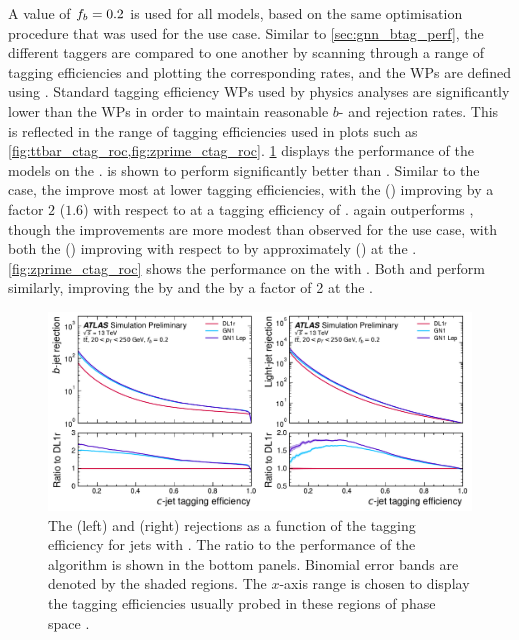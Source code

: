 A value of $f_b = 0.2$ is used for all models, based on the same optimisation procedure that was used for the \btag use case.
Similar to \cref{sec:gnn_btag_perf}, the different taggers are compared to one another by scanning through a range of \cjet tagging efficiencies and plotting the corresponding \blrej rates, and the WPs are defined using \ttbarjets.
Standard \cjet tagging efficiency WPs used by physics analyses are significantly lower than the \btag WPs in order to maintain reasonable $b$- and \ljet rejection rates.
This is reflected in the range of \cjet tagging efficiencies used in \ctag plots such as \cref{fig:ttbar_ctag_roc,fig:zprime_ctag_roc}.
\cref{fig:ttbar_ctag_roc} displays the \ctag performance of the models on the \ttbarjets.
\GNN is shown to perform significantly better than \DLr.
Similar to the \btag case, the \blrej improve most at lower \cjet tagging efficiencies, with the \crej (\lrej) improving by a factor $2$ ($1.6$) with respect to \DLr at a \cjet tagging efficiency of .
\GNNLep again outperforms \GNN, though the improvements are more modest than observed for the \btag use case, with both the \brej (\lrej) improving with respect to \GNN by approximately  () at the .
\cref{fig:zprime_ctag_roc} shows the \ctag performance on the \Zprimejets with \Zprimept.
Both \GNN and \GNNLep perform similarly, improving the \brej by  and the \lrej by a factor of 2 at the .

\begin{figure}[!p]
    \centering
    \includegraphics[width=\textwidth]{chapters/gnn_tagger/figs/results/main/ttbar/ttbar_roc_ctag.pdf}
    \caption{
        The \bjet (left) and \ljet (right) rejections as a function of the \cjet tagging efficiency for \ttbar jets with \ttbarpt.
        The ratio to the performance of the \DLr algorithm is shown in the bottom panels.
        Binomial error bands are denoted by the shaded regions.
        The $x$-axis range is chosen to display the \cjet tagging efficiencies usually probed in these regions of phase space \cite{ATL-PHYS-PUB-2022-027}.
    }
    \label{fig:ttbar_ctag_roc}
\end{figure}

